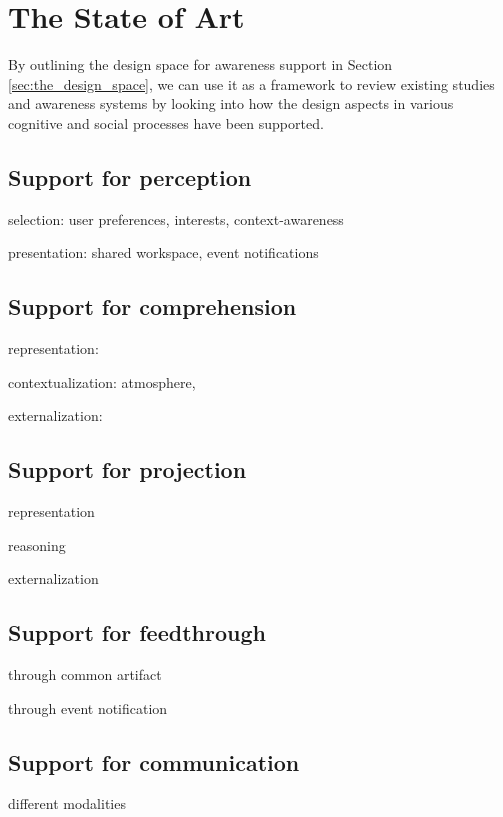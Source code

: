 
\section{The State of Art} %
\label{sec:the_state_of_art}
By outlining the design space for awareness support in Section \ref{sec:the_design_space}, we can use it as a framework to review existing studies and awareness systems by looking into how the design aspects in various cognitive and social processes have been supported.

\subsection{Support for perception} %
\label{sub:support_for_perception}
selection: user preferences, interests, context-awareness

presentation: shared workspace, event notifications


\subsection{Support for comprehension} %
\label{sub:support_for_comprehension}
representation:

contextualization: atmosphere, 

externalization:


\subsection{Support for projection} %
\label{sub:support_for_projection}
representation

reasoning

externalization


\subsection{Support for feedthrough} %
\label{sub:support_for_feedthrough}
through common artifact

through event notification


\subsection{Support for communication} %
\label{sub:support_for_communication}
different modalities

